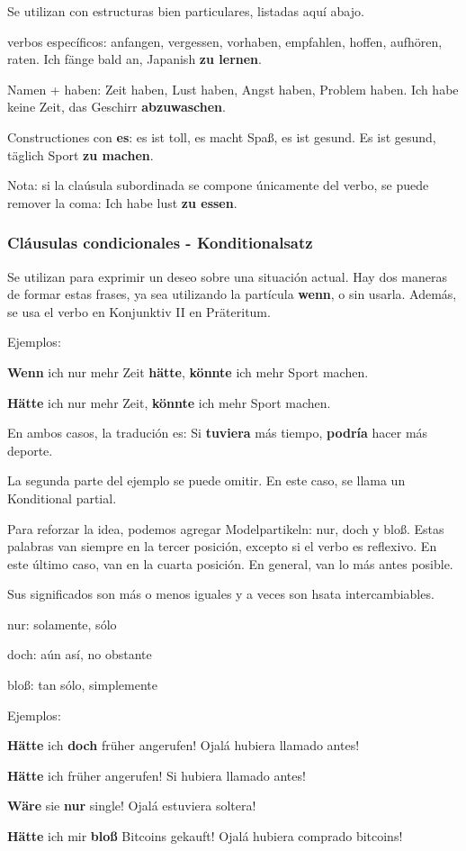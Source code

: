 Se utilizan con estructuras bien particulares, listadas aquí abajo.

\begin{myitemize}
\item verbos específicos: anfangen, vergessen, vorhaben, empfahlen, hoffen, aufhören, raten. Ich fänge bald an, Japanish \textbf{zu lernen}.
\item Namen + haben: Zeit haben, Lust haben, Angst haben, Problem haben. Ich habe keine Zeit, das Geschirr \textbf{abzuwaschen}.
\item Constructiones con \textbf{es}: es ist toll, es macht Spaß, es ist gesund. Es ist gesund, täglich Sport \textbf{zu machen}.
\end{myitemize}

Nota: si la claúsula subordinada se compone únicamente del verbo, se puede remover la coma: Ich habe lust \textbf{zu essen}.

\subsubsection{Cláusulas condicionales - Konditionalsatz}
Se utilizan para exprimir un deseo sobre una situación actual. Hay dos maneras de formar estas frases, ya sea utilizando la partícula \textbf{wenn}, o sin usarla. Además, se usa el verbo en Konjunktiv II en Präteritum.

Ejemplos:

\textbf{Wenn} ich nur mehr Zeit \textbf{hätte}, \textbf{könnte} ich mehr Sport machen.

\textbf{Hätte} ich nur mehr Zeit, \textbf{könnte} ich mehr Sport machen.

En ambos casos, la tradución es: Si \textbf{tuviera} más tiempo, \textbf{podría} hacer más deporte. 

La segunda parte del ejemplo se puede omitir. En este caso, se llama un Konditional partial.

Para reforzar la idea, podemos agregar Modelpartikeln: nur, doch y bloß.
Estas palabras van siempre en la tercer posición, excepto si el verbo es reflexivo. En este último caso, van en la cuarta posición. En general, van lo más antes posible.

Sus significados son más o menos iguales y a veces son hsata intercambiables. 
\begin{myitemize}
\item nur: solamente, sólo
\item doch: aún así, no obstante
\item bloß: tan sólo, simplemente
\end{myitemize}

Ejemplos:

\textbf{Hätte} ich \textbf{doch} früher angerufen! Ojalá hubiera llamado antes!

\textbf{Hätte} ich früher angerufen! Si hubiera llamado antes!

\textbf{Wäre} sie \textbf{nur} single! Ojalá estuviera soltera!

\textbf{Hätte} ich mir \textbf{bloß} Bitcoins gekauft! Ojalá hubiera comprado bitcoins!

